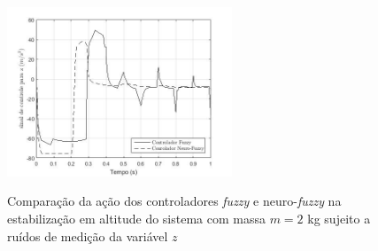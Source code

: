 \begin{figure}[!htb]
    \centering
    \caption{Comparação da ação dos controladores \textit{fuzzy} e neuro-\textit{fuzzy} na estabilização em altitude do sistema com massa $m=2$ kg sujeito a ruídos de medição da variável $z$}
    \includegraphics[width=0.6\textwidth]{./04-figuras/figuras_pos_banca/7-altitude2kg_ruido/graph_control_z_ruidos}
    \label{fig:graph_control_z_ruidos}
\end{figure}
